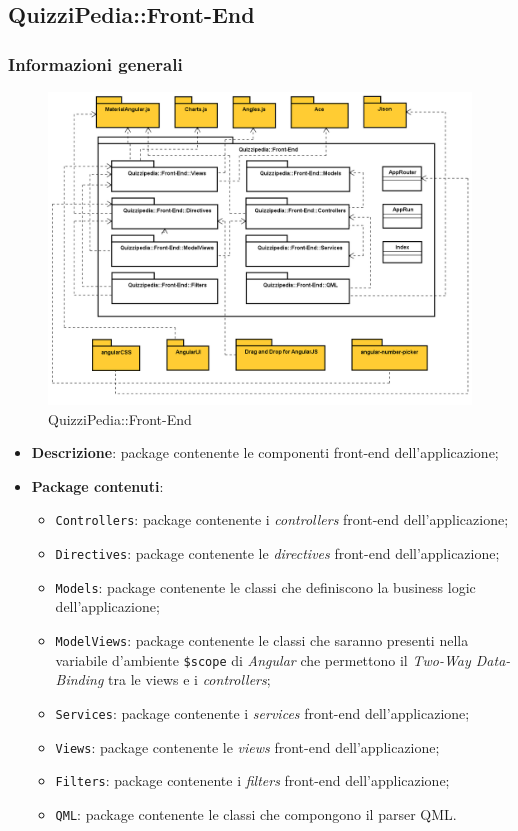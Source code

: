 \subsection{QuizziPedia::Front-End}
\subsubsection{Informazioni generali}
\label{QuizziPedia::Front-End}
\begin{figure}[ht]
	\centering
	\includegraphics[scale=0.35]{UML/Package/QuizziPedia_Front-end.png}
	\caption{QuizziPedia::Front-End}
\end{figure}
\FloatBarrier
	\begin{itemize}
		\item \textbf{Descrizione}: package contenente le componenti front-end dell'applicazione;
		\item \textbf{Package contenuti}:
		\begin{itemize}
			\item \texttt{Controllers}: package contenente i \textit{controllers} front-end dell'applicazione;
			\item \texttt{Directives}: package contenente le \textit{directives} front-end dell'applicazione;
			\item \texttt{Models}: package contenente le classi che definiscono la business logic dell'applicazione;
			\item \texttt{ModelViews}: package contenente le classi che saranno presenti nella variabile d'ambiente \texttt{\$scope} di \textit{Angular} che permettono il \textit{Two-Way Data-Binding} tra le views e i \textit{controllers};
			\item \texttt{Services}: package contenente i \textit{services} front-end dell'applicazione;
			\item \texttt{Views}: package contenente le \textit{views} front-end dell'applicazione;
			\item \texttt{Filters}: package contenente i \textit{filters} front-end dell'applicazione;
			\item \texttt{QML}: package contenente le classi che compongono il parser QML.
		\end{itemize}
	\end{itemize}

